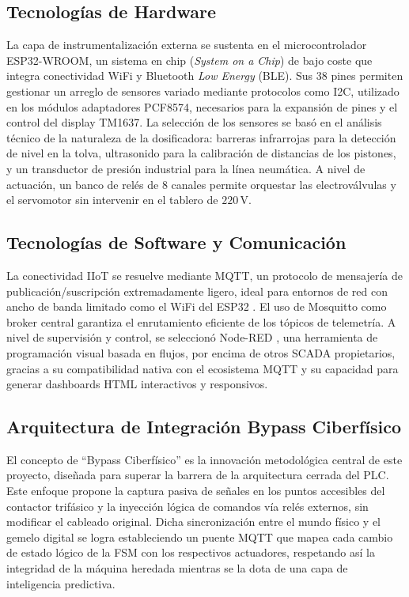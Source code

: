 \subsection*{Tecnologías de Hardware}
La capa de instrumentalización externa se sustenta en el microcontrolador ESP32-WROOM, un sistema en chip (\textit{System on a Chip}) de bajo coste que integra conectividad WiFi y Bluetooth \textit{Low Energy} (BLE). Sus 38 pines permiten gestionar un arreglo de sensores variado mediante protocolos como I2C, utilizado en los módulos adaptadores PCF8574, necesarios para la expansión de pines y el control del display TM1637. La selección de los sensores se basó en el análisis técnico de la naturaleza de la dosificadora: barreras infrarrojas para la detección de nivel en la tolva, ultrasonido para la calibración de distancias de los pistones, y un transductor de presión industrial para la línea neumática. A nivel de actuación, un banco de relés de 8 canales permite orquestar las electroválvulas y el servomotor sin intervenir en el tablero de $220\,\text{V}$.

\subsection*{Tecnologías de Software y Comunicación}
La conectividad IIoT se resuelve mediante MQTT, un protocolo de mensajería de publicación/suscripción extremadamente ligero, ideal para entornos de red con ancho de banda limitado como el WiFi del ESP32 \cite{hunkeler2008}. El uso de Mosquitto como broker central \cite{light2017} garantiza el enrutamiento eficiente de los tópicos de telemetría. A nivel de supervisión y control, se seleccionó Node-RED \cite{blackstock2014}, una herramienta de programación visual basada en flujos, por encima de otros SCADA propietarios, gracias a su compatibilidad nativa con el ecosistema MQTT y su capacidad para generar dashboards HTML interactivos y responsivos.

\subsection*{Arquitectura de Integración Bypass Ciberfísico}
El concepto de ``Bypass Ciberfísico'' es la innovación metodológica central de este proyecto, diseñada para superar la barrera de la arquitectura cerrada del PLC. Este enfoque propone la captura pasiva de señales en los puntos accesibles del contactor trifásico y la inyección lógica de comandos vía relés externos, sin modificar el cableado original. Dicha sincronización entre el mundo físico y el gemelo digital se logra estableciendo un puente MQTT que mapea cada cambio de estado lógico de la FSM con los respectivos actuadores, respetando así la integridad de la máquina heredada mientras se la dota de una capa de inteligencia predictiva.

